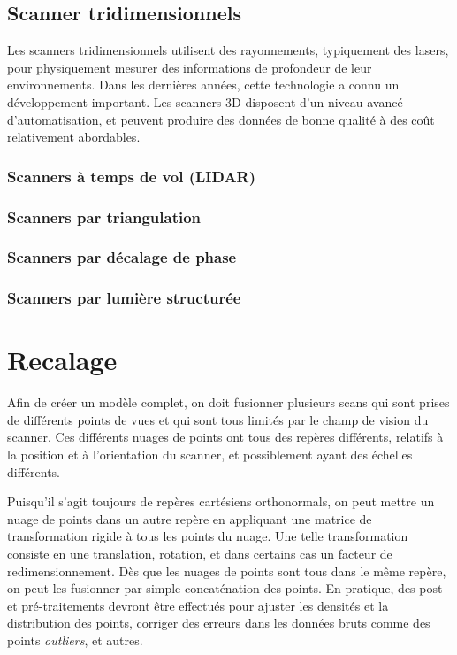 \documentclass[a4paper,10pt]{scrreprt}
\begin{document}
\subsection{Scanner tridimensionnels}
Les scanners tridimensionnels utilisent des rayonnements, typiquement des lasers, pour physiquement mesurer des informations de profondeur de leur environnements. Dans les dernières années, cette technologie a connu un développement important. Les scanners 3D disposent d'un niveau avancé d'automatisation, et peuvent produire des données de bonne qualité \cite{Grus2012} à des coût relativement abordables.

\subsubsection{Scanners à temps de vol (LIDAR)}
\subsubsection{Scanners par triangulation}
\subsubsection{Scanners par décalage de phase}
\subsubsection{Scanners par lumière structurée}



\section{Recalage}
Afin de créer un modèle complet, on doit fusionner plusieurs scans qui sont prises de différents points de vues et qui sont tous limités par le champ de vision du scanner. Ces différents nuages de points ont tous des repères différents, relatifs à la position et à l'orientation du scanner, et possiblement ayant des échelles différents.

Puisqu'il s'agit toujours de repères cartésiens orthonormals, on peut mettre un nuage de points dans un autre repère en appliquant une matrice de transformation rigide à tous les points du nuage. Une telle transformation consiste en une translation, rotation, et dans certains cas un facteur de redimensionnement. Dès que les nuages de points sont tous dans le même repère, on peut les fusionner par simple concaténation des points. En pratique, des post- et pré-traitements devront être effectués pour ajuster les densités et la distribution des points, corriger des erreurs dans les données bruts comme des points \emph{outliers}, et autres.
\end{document}
